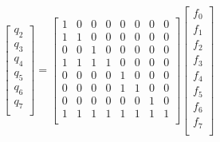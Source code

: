 \documentclass[twoside]{article}
\begin{document}
\begin{equation*}
\begin{equation}
\begin{bmatrix}
                q_2 \\
                q_3 \\
                q_4 \\
                q_5 \\
                q_6 \\
                q_7 \\
        \end{bmatrix} =
 \begin{bmatrix}
                1 & 0 & 0 & 0 & 0 & 0 & 0 & 0 \\
                1 & 1 & 0 & 0 & 0 & 0 & 0 & 0 \\
                0 & 0 & 1 & 0 & 0 & 0 & 0 & 0 \\
                1 & 1 & 1 & 1 & 0 & 0 & 0 & 0 \\
                0 & 0 & 0 & 0 & 1 & 0 & 0 & 0 \\
                0 & 0 & 0 & 0 & 1 & 1 & 0 & 0 \\
                0 & 0 & 0 & 0 & 0 & 0 & 1 & 0 \\
                1 & 1 & 1 & 1 & 1 & 1 & 1 & 1 \\
        \end{bmatrix}        
        \begin{bmatrix}
                f_0 \\
                f_1 \\
                f_2 \\
                f_3 \\
                f_4 \\
                f_5 \\
                f_6 \\
                f_7 \\
        \end{bmatrix}
        \end{equation}


\end{equation*}
\end{document}
